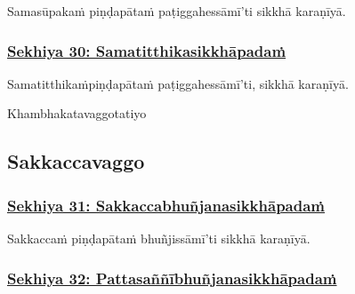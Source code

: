Samasūpakaṁ piṇḍapātaṁ paṭiggahessāmī'ti sikkhā karaṇīyā.



\subsubsection*{\hyperref[training30]{Sekhiya 30: Samatitthikasikkhāpadaṁ}}
\label{sekh30}

Samatitthikaṁ\makeatletter\hyperlink{endnote480-appendix}\makeatother \thinspace piṇḍapātaṁ paṭiggahessāmī'ti, sikkhā karaṇīyā.

\begin{center}
	Khambhakatavaggo\makeatletter\hyperlink{endnote481-appendix}\makeatother \thinspace tatiyo\makeatletter\hyperlink{endnote482-appendix}\makeatother \thinspace
\end{center}



\subsection{Sakkaccavaggo}

\subsubsection*{\hyperref[training31]{Sekhiya 31: Sakkaccabhuñjanasikkhāpadaṁ}}
\label{sekh31}

Sakkaccaṁ piṇḍapātaṁ bhuñjissāmī'ti sikkhā karaṇīyā.



\subsubsection*{\hyperref[training32]{Sekhiya 32: Pattasaññībhuñjanasikkhāpadaṁ}}
\label{sekh32}

